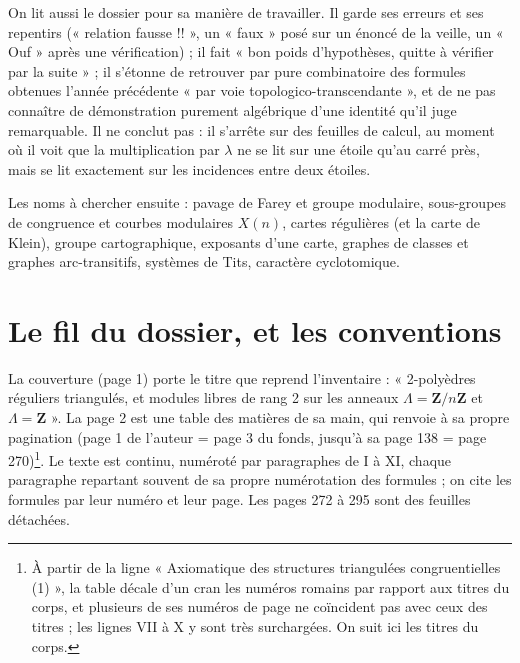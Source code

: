 \documentclass[11pt,a4paper]{article}
\begin{document}
\begin{resume}
On lit aussi le dossier pour sa manière de travailler. Il garde ses erreurs
et ses repentirs (« relation fausse !! », un « faux » posé sur un énoncé de la
veille, un « Ouf » après une vérification) ; il fait « bon poids
d'hypothèses, quitte à vérifier par la suite » ; il s'étonne de retrouver par
pure combinatoire des formules obtenues l'année précédente « par voie
topologico-transcendante », et de ne pas connaître de démonstration purement
algébrique d'une identité qu'il juge remarquable. Il ne conclut pas : il
s'arrête sur des feuilles de calcul, au moment où il voit que la
multiplication par $\lambda$ ne se lit sur une étoile qu'au carré près, mais
se lit exactement sur les incidences entre deux étoiles.

Les noms à chercher ensuite : pavage de Farey et groupe modulaire, sous-groupes
de congruence et courbes modulaires $X(n)$, cartes régulières (et la carte de
Klein), groupe cartographique, exposants d'une carte, graphes de classes et
graphes arc-transitifs, systèmes de Tits, caractère cyclotomique.

\end{resume}

\section*{Le fil du dossier, et les conventions}

La couverture (page 1) porte le titre que reprend l'inventaire : « 2-polyèdres
réguliers triangulés, et modules libres de rang 2 sur les anneaux $\Lambda =
\mathbf{Z}/n\mathbf{Z}$ et $\Lambda = \mathbf{Z}$ ». La page 2 est une table des
matières de sa main, qui renvoie à sa propre pagination (page 1 de l'auteur =
page 3 du fonds, jusqu'à sa page 138 = page 270)\footnote{À partir de la
ligne « Axiomatique des structures triangulées congruentielles (1) », la table
décale d'un cran les numéros romains par rapport aux titres du corps, et
plusieurs de ses numéros de page ne coïncident pas avec ceux des titres ; les
lignes VII à X y sont très surchargées. On suit ici les titres du corps.}. Le
texte est continu, numéroté par paragraphes de I à XI, chaque paragraphe
repartant souvent de sa propre numérotation des formules ; on cite les
formules par leur numéro et leur page. Les pages 272 à 295 sont des feuilles
détachées.
\end{document}
